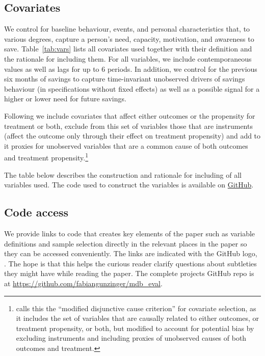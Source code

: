 \subsection{Covariates}%
\label{sub:covariates}

We control for baseline behaviour, events, and personal characteristics that,
to various degrees, capture a person's need, capacity, motivation, and
awareness to save. Table~\ref{tab:vars} lists all covariates used
together with their definition and the rationale for including them. For all
variables, we include contemporaneous values as well as lags for up to 6
periods. In addition, we control for the previous six months of savings to
capture time-invariant unobserved drivers of savings behaviour (in
specifications without fixed effects) as well as a possible signal for a higher
or lower need for future savings.

Following \citet{vanderweele2019principles} we include covariates that affect
either outcomes or the propensity for treatment or both, exclude from this
set of variables those that are instruments (affect the outcome only through their effect on
treatment propensity) and add to it proxies for unobserved variables that are a
common cause of both outcomes and treatment propensity.\footnote{
\citet{vanderweele2019principles} calls this the ``modified disjunctive cause
criterion'' for covariate selection, as it includes the set of variables that are causally
related to either outcomes, or treatment propensity, or both, but modified to
account for potential bias by excluding instruments and including proxies of
unobserved causes of both outcomes and treatment.}

The table below describes the construction and rationale for including of all
variables used. The code used to construct the variables is available on
\href{https://github.com/fabiangunzinger/mdb_eval/blob/d094f8cd364f64bbe3d4e644abbff726af86de2f/src/data/aggregators.py}{GitHub}.




\subsection{Code access}%
\label{sub:code_access}

We provide links to code that creates key elements of the paper such as
variable definitions and sample selection directly in the relevant places in
the paper so they can be accessed conveniently. The links are indicated with
the GitHub logo, \faGithub. The hope is that this helps the
curious reader clarify questions about subtleties they might have while reading
the paper. The complete projects GitHub repo is at
\href{https://github.com/fabiangunzinger/mdb\_eval}{https://github.com/fabiangunzinger/mdb\_eval}.


